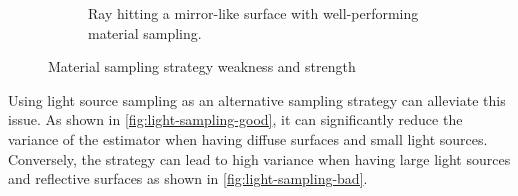 \begin{figure}[H]
\begin{subfigure}[t]{0.45\textwidth}
    \caption{Ray hitting a mirror-like surface with well-performing material sampling.}
    \label{fig:material-sampling-good}
  \end{subfigure}
  \caption{Material sampling strategy weakness and strength}
  \label{fig:material-sampling}
\end{figure}

Using light source sampling as an alternative sampling strategy can alleviate this issue. As shown in \autoref{fig:light-sampling-good}, it can significantly reduce the variance of the estimator when having diffuse surfaces and small light sources. Conversely, the strategy can lead to high variance when having large light sources and reflective surfaces as shown in \autoref{fig:light-sampling-bad}.

